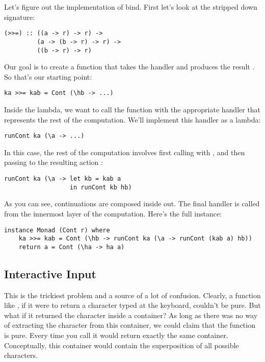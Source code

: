 Let's figure out the implementation of bind. First let's look at the
stripped down signature:

\begin{Verbatim}
(>>=) :: ((a -> r) -> r) ->
         (a -> (b -> r) -> r) ->
         ((b -> r) -> r)
\end{Verbatim}
Our goal is to create a function that takes the handler
 and produces the result . So
that's our starting point:

\begin{Verbatim}
ka >>= kab = Cont (\hb -> ...)
\end{Verbatim}
Inside the lambda, we want to call the function  with the
appropriate handler that represents the rest of the computation. We'll
implement this handler as a lambda:

\begin{Verbatim}
runCont ka (\a -> ...)
\end{Verbatim}
In this case, the rest of the computation involves first calling
 with , and then passing  to the
resulting action :

\begin{Verbatim}
runCont ka (\a -> let kb = kab a 
                  in runCont kb hb)
\end{Verbatim}
As you can see, continuations are composed inside out. The final handler
 is called from the innermost layer of the computation.
Here's the full instance:

\begin{verbatim}
instance Monad (Cont r) where
    ka >>= kab = Cont (\hb -> runCont ka (\a -> runCont (kab a) hb))
    return a = Cont (\ha -> ha a)
\end{verbatim}

\subsection{Interactive Input}

This is the trickiest problem and a source of a lot of confusion.
Clearly, a function like , if it were to return a
character typed at the keyboard, couldn't be pure. But what if it
returned the character inside a container? As long as there was no way
of extracting the character from this container, we could claim that the
function is pure. Every time you call  it would return
exactly the same container. Conceptually, this container would contain
the superposition of all possible characters.

